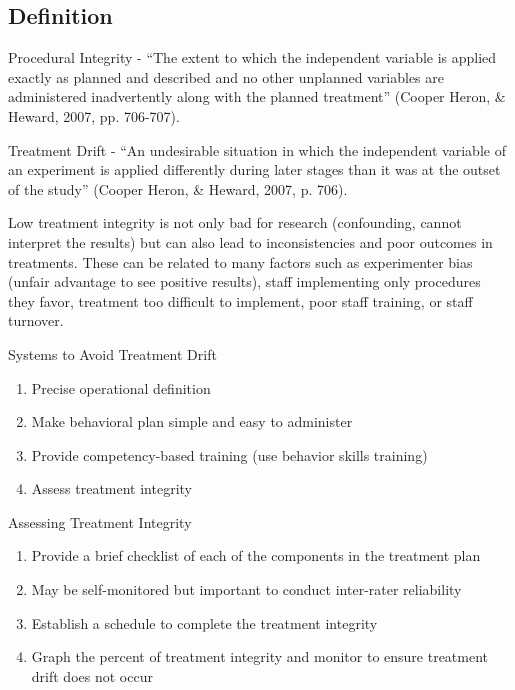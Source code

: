 \subsection{Definition}
Procedural Integrity - ``The extent to which the independent variable is applied exactly as planned and described and no other unplanned variables are administered inadvertently along with the planned treatment'' (Cooper Heron, \& Heward, 2007, pp. 706-707).

Treatment Drift - ``An undesirable situation in which the independent variable of an experiment is applied differently during later stages than it was at the outset of the study'' (Cooper Heron, \& Heward, 2007, p. 706).

Low treatment integrity is not only bad for research (confounding, cannot interpret the results) but can also lead to inconsistencies and poor outcomes in treatments.  These can be related to many factors such as experimenter bias (unfair advantage to see positive results), staff implementing only procedures they favor, treatment too difficult to implement, poor staff training, or staff turnover.

Systems to Avoid Treatment Drift
\begin{enumerate}
\item Precise operational definition
\item Make behavioral plan simple and easy to administer
\item Provide competency-based training (use behavior skills training)
\item Assess treatment integrity
\end{enumerate}

Assessing Treatment Integrity
\begin{enumerate}
\item Provide a brief checklist of each of the components in the treatment plan
\item May be self-monitored but important to conduct inter-rater reliability
\item Establish a schedule to complete the treatment integrity
\item Graph the percent of treatment integrity and monitor to ensure treatment drift does not occur
\end{enumerate}
%
